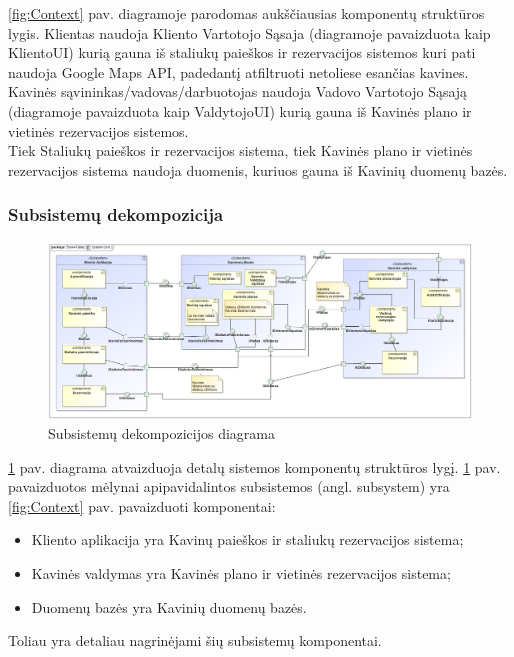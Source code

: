 \documentclass{VUMIFPSkursinis}
\begin{document}
\ref {fig:Context} pav. diagramoje parodomas aukščiausias komponentų struktūros lygis. Klientas naudoja Kliento Vartotojo Sąsaja (diagramoje pavaizduota kaip KlientoUI) kurią gauna iš staliukų paieškos ir rezervacijos sistemos kuri pati naudoja Google Maps API, padedantį atfiltruoti netoliese esančias kavines. \\
Kavinės sąvininkas/vadovas/darbuotojas naudoja Vadovo Vartotojo Sąsają (diagramoje pavaizduota kaip ValdytojoUI) kurią gauna iš Kavinės plano ir vietinės rezervacijos sistemos.\\
Tiek Staliukų paieškos ir rezervacijos sistema, tiek Kavinės plano ir vietinės rezervacijos sistema naudoja duomenis, kuriuos gauna iš Kavinių duomenų bazės.


\begin{landscape}
\subsubsection{Subsistemų dekompozicija}
	\begin {figure}[H]
		\includegraphics[width=1.65\textwidth,height=1.65\textheight,keepaspectratio]{img/SystemCore}
		\caption{Subsistemų dekompozicijos diagrama}
		\label{fig:System Core}
	\end{figure}
\end{landscape}

\ref {fig:System Core} pav. diagrama atvaizduoja detalų sistemos komponentų struktūros lygį. \ref {fig:System Core} pav. pavaizduotos mėlynai apipavidalintos subsistemos (angl. subsystem) yra \ref {fig:Context} pav. pavaizduoti komponentai:
\begin{itemize}
  \item Kliento aplikacija yra Kavinų paieškos ir staliukų rezervacijos sistema;
  \item Kavinės valdymas yra Kavinės plano ir vietinės rezervacijos sistema;
  \item Duomenų bazės yra Kavinių duomenų bazės.
\end{itemize}
Toliau yra detaliau nagrinėjami šių subsistemų komponentai.\\
\end{document}
